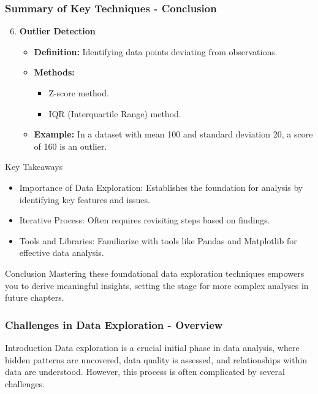 \documentclass[aspectratio=169]{beamer}
\begin{document}
\begin{frame}[fragile]
    \frametitle{Summary of Key Techniques - Conclusion}
    \begin{enumerate}
        \setcounter{enumi}{5} %
        \item \textbf{Outlier Detection}
            \begin{itemize}
                \item \textbf{Definition:} Identifying data points deviating from observations.
                \item \textbf{Methods:}
                \begin{itemize}
                    \item Z-score method.
                    \item IQR (Interquartile Range) method.
                \end{itemize}
                \item \textbf{Example:} In a dataset with mean 100 and standard deviation 20, a score of 160 is an outlier.
            \end{itemize}
    \end{enumerate}
    
    \begin{block}{Key Takeaways}
        \begin{itemize}
            \item Importance of Data Exploration: Establishes the foundation for analysis by identifying key features and issues.
            \item Iterative Process: Often requires revisiting steps based on findings.
            \item Tools and Libraries: Familiarize with tools like Pandas and Matplotlib for effective data analysis.
        \end{itemize}
    \end{block}

    \begin{block}{Conclusion}
        Mastering these foundational data exploration techniques empowers you to derive meaningful insights, setting the stage for more complex analyses in future chapters.
    \end{block}
\end{frame}

\begin{frame}
    \frametitle{Challenges in Data Exploration - Overview}
    \begin{block}{Introduction}
        Data exploration is a crucial initial phase in data analysis, where hidden patterns are uncovered, data quality is assessed, 
        and relationships within data are understood. However, this process is often complicated by several challenges.
    \end{block}
\end{frame}
\end{document}
